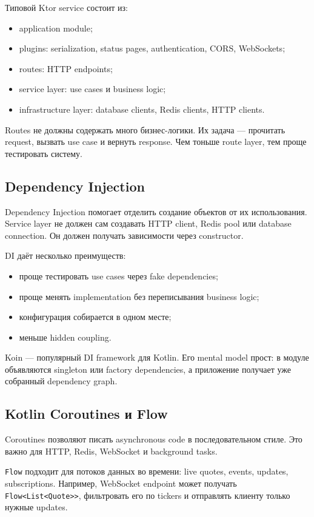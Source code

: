 \documentclass[12pt,a4paper]{article}
\begin{document}
Типовой Ktor service состоит из:
\begin{itemize}
    \item application module;
    \item plugins: serialization, status pages, authentication, CORS, WebSockets;
    \item routes: HTTP endpoints;
    \item service layer: use cases и business logic;
    \item infrastructure layer: database clients, Redis clients, HTTP clients.
\end{itemize}

Routes не должны содержать много бизнес-логики. Их задача --- прочитать request,
вызвать use case и вернуть response. Чем тоньше route layer, тем проще
тестировать систему.

\subsection{Dependency Injection}

Dependency Injection помогает отделить создание объектов от их использования.
Service layer не должен сам создавать HTTP client, Redis pool или database
connection. Он должен получать зависимости через constructor.

DI даёт несколько преимуществ:
\begin{itemize}
    \item проще тестировать use cases через fake dependencies;
    \item проще менять implementation без переписывания business logic;
    \item конфигурация собирается в одном месте;
    \item меньше hidden coupling.
\end{itemize}

Koin --- популярный DI framework для Kotlin. Его mental model прост: в модуле
объявляются singleton или factory dependencies, а приложение получает уже
собранный dependency graph.

\subsection{Kotlin Coroutines и Flow}

Coroutines позволяют писать asynchronous code в последовательном стиле. Это важно
для HTTP, Redis, WebSocket и background tasks.

\texttt{Flow} подходит для потоков данных во времени: live quotes, events,
updates, subscriptions. Например, WebSocket endpoint может получать
\texttt{Flow<List<Quote>>}, фильтровать его по tickers и отправлять клиенту
только нужные updates.
\end{document}
